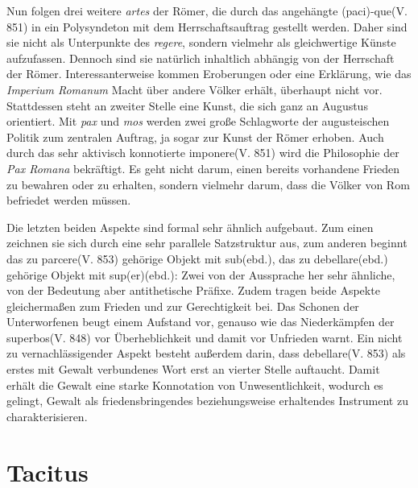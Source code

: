 \documentclass[12pt]{article}
\begin{document}
	Nun folgen drei weitere \textit{artes} der Römer, die durch das angehängte \glqq (paci)-que\grqq(V. 851) in ein Polysyndeton mit dem Herrschaftsauftrag gestellt werden. Daher sind sie nicht als Unterpunkte des \textit{regere}, sondern vielmehr als gleichwertige Künste aufzufassen. Dennoch sind sie natürlich inhaltlich abhängig von der Herrschaft der Römer. Interessanterweise kommen Eroberungen oder eine Erklärung, wie das \textit{Imperium Romanum} Macht über andere Völker erhält, überhaupt nicht vor. Stattdessen steht an zweiter Stelle eine Kunst, die sich ganz an Augustus orientiert. Mit \textit{pax} und \textit{mos} werden zwei große Schlagworte der augusteischen Politik zum zentralen Auftrag, ja sogar zur Kunst der Römer erhoben. Auch durch das sehr aktivisch konnotierte \glqq imponere\grqq(V. 851) wird die Philosophie der \textit{Pax Romana} bekräftigt. Es geht nicht darum, einen bereits vorhandene Frieden zu bewahren oder zu erhalten, sondern vielmehr darum, dass die Völker von Rom befriedet werden müssen.
	
	Die letzten beiden Aspekte sind formal sehr ähnlich aufgebaut. Zum einen zeichnen sie sich durch eine sehr parallele Satzstruktur aus, zum anderen beginnt das zu \glqq parcere\grqq(V. 853) gehörige Objekt mit \glqq sub\grqq(ebd.), das zu \glqq debellare\grqq(ebd.) gehörige Objekt mit \glqq sup(er)\grqq(ebd.): Zwei von der Aussprache her sehr ähnliche, von der Bedeutung aber antithetische Präfixe. Zudem tragen beide Aspekte gleichermaßen zum Frieden und zur Gerechtigkeit bei. Das Schonen der Unterworfenen beugt einem Aufstand vor, genauso wie das Niederkämpfen der \glqq superbos\grqq(V. 848) vor Überheblichkeit und damit vor Unfrieden warnt. Ein nicht zu vernachlässigender Aspekt besteht außerdem darin, dass \glqq debellare\grqq(V. 853) als erstes mit Gewalt verbundenes Wort erst an vierter Stelle auftaucht. Damit erhält die Gewalt eine starke Konnotation von Unwesentlichkeit, wodurch es gelingt, Gewalt als friedensbringendes beziehungsweise erhaltendes Instrument zu charakterisieren.
	\section{Tacitus}
\end{document}
